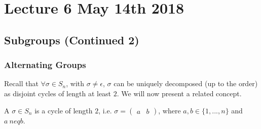 \documentclass[notoc,notitlepage]{tufte-book}
\begin{document}



\chapter{Lecture 6 May 14th 2018}
\label{chp:lecture_6_may_14th_2018}

\section{Subgroups (Continued 2)}
\label{sec:subgroups_continued_2}

\subsection{Alternating Groups}
\label{sub:alternating_groups}

Recall that $\forall \sigma \in S_n$, with $\sigma \neq \epsilon$, $\sigma$ can be uniquely decomposed (up to the order) as disjoint cycles of length at least $2$. We will now present a related concept.

\begin{defn}[Transposition]\label{defn:transposition}
  A  $\sigma \in S_n$ is a cycle of length $2$, i.e. $\sigma = \begin{pmatrix} a & b \end{pmatrix}$, where $a, b \in \{1, ..., n\}$ and $a\ neq b$.
\end{defn}
\end{document}

